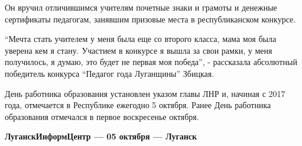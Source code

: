 Он вручил отличившимся учителям почетные знаки и грамоты и денежные сертификаты
педагогам, занявшим призовые места в республиканском конкурсе.

\enquote{Мечта стать учителем у меня была еще со второго класса, мама моя была уверена
кем я стану. Участием в конкурсе я вышла за свои рамки, у меня получилось, я
думаю, это будет не первая моя победа}, - рассказала абсолютный победитель
конкурса \enquote{Педагог года Луганщины} Збицкая.

День работника образования установлен указом главы ЛНР и, начиная с 2017 года, отмечается в Республике ежегодно 5 октября. Ранее День работника образования отмечался в первое воскресенье октября.

\textbf{ЛуганскИнформЦентр — 05 октября — Луганск}

